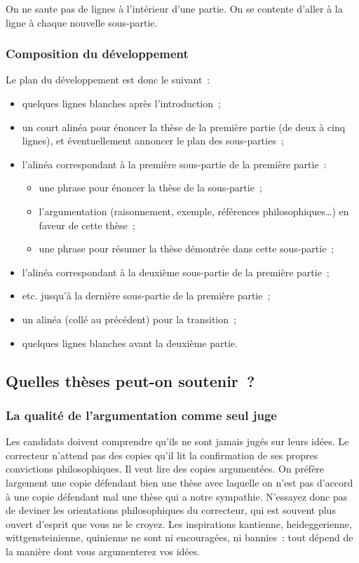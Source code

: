 \documentclass[a4paper,12pt]{article}
\begin{document}
On ne saute pas de lignes à l'intérieur d'une partie. On se contente
d'aller à la ligne à chaque nouvelle sous-partie.

\subsubsection{Composition du développement}
\label{sec-3-1-4}

Le plan du développement est donc le suivant :

\begin{itemize}
\item quelques lignes blanches après l'introduction ;
\item un court alinéa pour énoncer la thèse de la première partie (de deux à
cinq lignes), et éventuellement annoncer le plan des sous-parties ;
\item l'alinéa correspondant à la première sous-partie de la première partie :
\begin{itemize}
\item une phrase pour énoncer la thèse de la sous-partie ;
\item l'argumentation (raisonnement, exemple, références
philosophiques\ldots{}) en faveur de cette thèse ;
\item une phrase pour résumer la thèse démontrée dans cette sous-partie ;
\end{itemize}
\item l'alinéa correspondant à la deuxième sous-partie de la première
partie ;
\item etc. jusqu'à la dernière sous-partie de la première partie ;
\item un alinéa (collé au précédent) pour la transition ;
\item quelques lignes blanches avant la deuxième partie.
\end{itemize}

\subsection{Quelles thèses peut-on soutenir ?}
\label{sec-3-2}

\subsubsection{La qualité de l'argumentation comme seul juge}
\label{sec-3-2-1}

Les candidats doivent comprendre qu'ils ne sont jamais jugés sur leurs
idées. Le correcteur n'attend pas des copies qu'il lit la confirmation
de ses propres convictions philosophiques. Il veut lire des copies
argumentées. On préfère largement une copie défendant bien une thèse
avec laquelle on n'est pas d'accord à une copie défendant mal une thèse
qui a notre sympathie. N'essayez donc pas de deviner les orientations
philosophiques du correcteur, qui est souvent plus ouvert d'esprit que
vous ne le croyez. Les inspirations kantienne, heideggerienne,
wittgensteinienne, quinienne ne sont ni encouragées, ni bannies : tout
dépend de la manière dont vous argumenterez vos idées.
\end{document}
